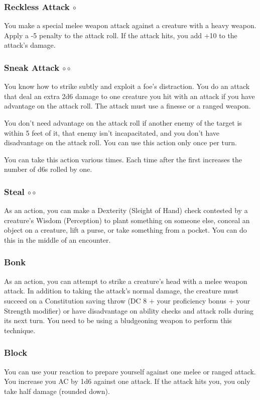 \subsubsection{Reckless Attack $\circ$} \label{act::recklessattack}
    You make a special melee weapon attack against a creature with a heavy weapon.
    Apply a -5 penalty to the attack roll.
    If the attack hits, you add +10 to the attack's damage.

\subsubsection{Sneak Attack $\circ\circ$} \label{act::sneakattack}
    You know how to strike subtly and exploit a foe's distraction.
    You do an attack that deal an extra 2d6 damage to one creature you hit with an attack if you have advantage on the attack roll.
    The attack must use a finesse or a ranged weapon.

    You don't need advantage on the attack roll if another enemy of the target is within 5 feet of it, that enemy isn't incapacitated, and you don't have disadvantage on the attack roll.
    You can use this action only once per turn.

    You can take this action various times.
    Each time after the first increases the number of d6s rolled by one.

\subsubsection{Steal $\circ\circ$} \label{act::steal}
    As an action, you can make a Dexterity (Sleight of Hand) check contested by a creature's Wisdom (Perception) to plant something on someone else, conceal an object on a creature, lift a purse, or take something from a pocket.
    You can do this in the middle of an encounter.

\subsubsection{Bonk} \label{tec::bonk}
As an action, you can attempt to strike a creature's head with a melee weapon attack.
In addition to taking the attack's normal damage, the creature must succeed on a Constitution saving throw (DC 8 + your proficiency bonus + your Strength modifier) or have disadvantage on ability checks and attack rolls during its next turn.
You need to be using a bludgeoning weapon to perform this technique.

\subsubsection{Block} \label{tec::block}
You can use your reaction to prepare yourself against one melee or ranged attack.
You increase you AC by 1d6 against one attack.
If the attack hits you, you only take half damage (rounded down).

